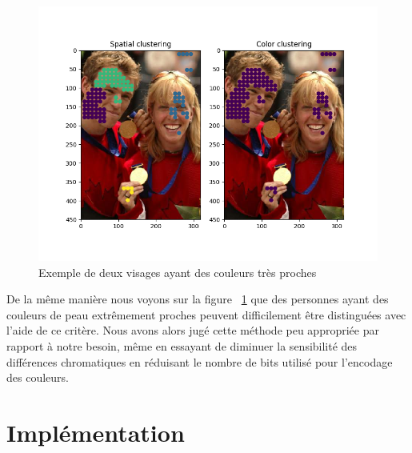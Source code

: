 \documentclass[a4paper,11pt]{article}
\begin{document}
\begin{figure}[H]
\begin{center}
    \includegraphics[scale=0.5]{color_clustering_close.png}
    \caption{Exemple de deux visages ayant des couleurs très proches} \end{center}
    \label{fig:color_clustering_close}
\end{figure}
De la même manière nous voyons sur la figure ~\ref{fig:color_clustering_close} que des personnes ayant des couleurs de peau extrêmement proches peuvent difficilement être distinguées avec l'aide de ce critère.
\newline
Nous avons alors jugé cette méthode peu appropriée par rapport à notre besoin, même en essayant de diminuer la sensibilité des différences chromatiques en réduisant le nombre de bits utilisé pour l'encodage des couleurs.
\section{Implémentation}
\end{document}
